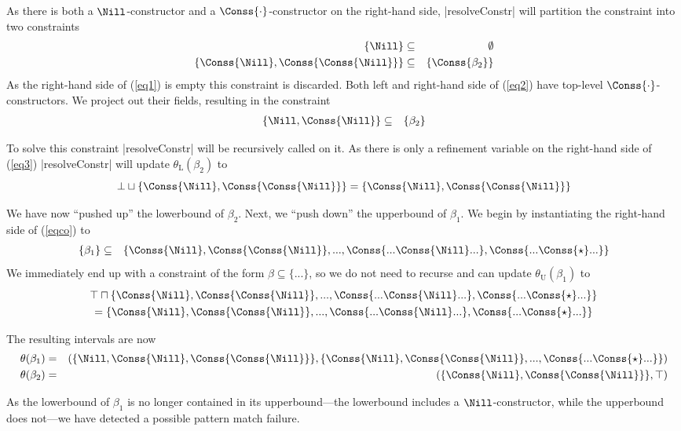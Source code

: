 As there is both a $\Nill$-constructor and a $\Conss{\cdot}$-constructor on the right-hand side, |resolveConstr| will partition the constraint into two constraints
\begin{eqnarray}
\{ \Nill \} &\subseteq& \emptyset \label{eq1} \\
\{ \Conss{\Nill}, \Conss{\Conss{\Nill}} \} &\subseteq& \{ \Conss{\beta_2} \} \label{eq2}
\end{eqnarray}
As the right-hand side of (\ref{eq1}) is empty this constraint is discarded. Both left and right-hand side of (\ref{eq2}) have top-level $\Conss{\cdot}$-constructors. We project out their fields, resulting in the constraint
\begin{eqnarray}
\{ \Nill, \Conss{\Nill} \} &\subseteq& \{ \beta_2 \} \label{eq3}
\end{eqnarray}

To solve this constraint |resolveConstr| will be recursively called on it. As there is only a refinement variable on the right-hand side of (\ref{eq3}) |resolveConstr| will update $\theta_\mathrm{L}(\beta_2)$ to \[\bot \sqcup \{\Conss{\Nill}, \Conss{\Conss{\Nill}}\} = \{\Conss{\Nill}, \Conss{\Conss{\Nill}}\}\]

We have now ``pushed up'' the lowerbound of $\beta_2$. Next, we ``push down'' the upperbound of $\beta_1$. We begin by instantiating the right-hand side of (\ref{eqco}) to
\begin{eqnarray}
\{\beta_1\} &\subseteq& \{\Conss{\Nill}, \Conss{\Conss{\Nill}}, ..., \Conss{...\Conss{\Nill}...},  \Conss{...\Conss{\star}...}\}
\end{eqnarray}
We immediately end up with a constraint of the form $\beta \subseteq \{ ... \}$, so we do not need to recurse and can update $\theta_\mathrm{U}(\beta_1)$ to
\begin{multline*}
\top \sqcap \{\Conss{\Nill}, \Conss{\Conss{\Nill}}, ..., \Conss{...\Conss{\Nill}...},  \Conss{...\Conss{\star}...}\} \\ = \{\Conss{\Nill}, \Conss{\Conss{\Nill}}, ..., \Conss{...\Conss{\Nill}...},  \Conss{...\Conss{\star}...}\}
\end{multline*}

The resulting intervals are now
\begin{eqnarray*}
\theta(\beta_1) &=& (\{\Nill, \Conss{\Nill}, \Conss{\Conss{\Nill}}\}, \{\Conss{\Nill}, \Conss{\Conss{\Nill}}, ...,  \Conss{...\Conss{\star}...}\}) \\
\theta(\beta_2) &=& (\{\Conss{\Nill}, \Conss{\Conss{\Nill}}\}, \top)
\end{eqnarray*}

As the lowerbound of $\beta_1$ is no longer contained in its upperbound---the lowerbound includes a $\Nill$-constructor, while the upperbound does not---we have detected a possible pattern match failure.

